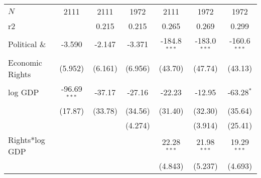 \documentclass[10pt,letterpaper,subeqn]{beamer}
\begin{document}
\begin{frame}[label=RightsComp]
\begin{table}[htbp]
{\begin{tabular}{l*{6}{c}}
\hline
\(N\)       &        2111         &        2111         &        1972         &        2111         &        1972         &        1972         \\
r2          &                     &       0.215         &       0.215         &       0.265         &       0.269         &       0.299         \\
\hline\hline

\multicolumn{1}{p{2cm}}{Political \& }       &      -3.590         &      -2.147         &      -3.371         &      -184.8$^{***}$&      -183.0$^{***}$&      -160.6$^{***}$\\
 Economic Rights          &     (5.952)         &     (6.161)         &     (6.956)         &     (43.70)         &     (47.74)         &     (43.13)         \\

log GDP        &      -96.69$^{***}$&      -37.17         &      -27.16         &      -22.23         &      -12.95         &      -63.28$^{*}$  \\
            &     (17.87)         &     (33.78)         &     (34.56)         &     (31.40)         &     (32.30)         &     (35.64)         \\

            &                     &                     &     (4.274)         &                     &     (3.914)         &     (25.41)         \\

Rights*log GDP    &                     &                     &                     &       22.28$^{***}$&       21.98$^{***}$&       19.29$^{***}$\\
            &                     &                     &                     &     (4.843)         &     (5.237)         &     (4.693)         \\



\end{tabular}}
\end{table}
\end{frame}
\end{document}
